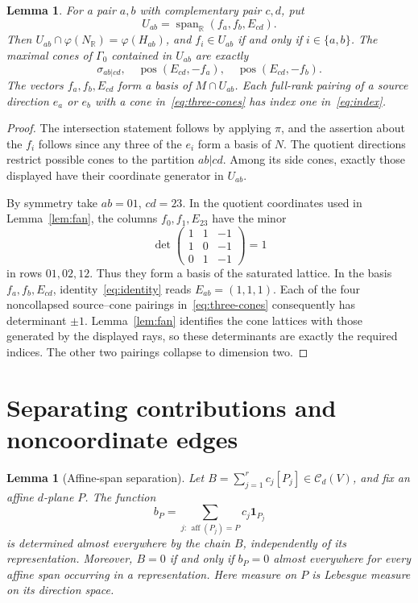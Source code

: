 \documentclass[11pt]{article}
\newtheorem{lemma}[theorem]{Lemma}
\theoremstyle{definition}
\theoremstyle{remark}
\newcommand{\R}{\mathbb R}
\newcommand{\Ch}{\mathcal C}
\newcommand{\NR}{N_{\R}}
\newcommand{\pos}{\operatorname{pos}}
\newcommand{\Span}{\operatorname{span}_{\R}}
\newcommand{\aff}{\operatorname{aff}}
\newcommand{\ind}{\mathbf 1}
\begin{document}
\begin{lemma}\label{lem:coordinate-linear}
For a pair $a,b$ with complementary pair $c,d$, put
\[
 U_{ab}=\Span(f_a,f_b,E_{cd}).
\]
Then $U_{ab}\cap\varphi(\NR)=\varphi(H_{ab})$, and
$f_i\in U_{ab}$ if and only if $i\in\{a,b\}$. The maximal cones
of $\Gamma_0$ contained in $U_{ab}$ are exactly
\begin{equation}\label{eq:three-cones}
 \sigma_{ab|cd},\quad
 \pos(E_{cd},-f_a),\quad\pos(E_{cd},-f_b).
\end{equation}
The vectors $f_a,f_b,E_{cd}$ form a basis of $M\cap U_{ab}$.
Each full-rank pairing of a source direction $e_a$ or $e_b$ with a
cone in~\eqref{eq:three-cones} has index one
in~\eqref{eq:index}.
\end{lemma}

\begin{proof}
The intersection statement follows by applying $\pi$, and the assertion
about the $f_i$ follows since any three of the $e_i$ form a basis of
$N$. The quotient directions restrict possible cones to the partition
$ab|cd$. Among its side cones, exactly those displayed have their
coordinate generator in $U_{ab}$.

By symmetry take $ab=01$, $cd=23$. In the quotient coordinates used in
Lemma~\ref{lem:fan}, the columns $f_0,f_1,E_{23}$ have the minor
\[
 \det\begin{pmatrix}
 1&1&-1\\1&0&-1\\0&1&-1
 \end{pmatrix}=1
\]
in rows $01,02,12$. Thus they form a basis of the saturated lattice.
In the basis $f_a,f_b,E_{cd}$, identity~\eqref{eq:identity} reads
$E_{ab}=(1,1,1)$. Each of the four noncollapsed source--cone pairings
in~\eqref{eq:three-cones} consequently has determinant $\pm1$.
Lemma~\ref{lem:fan} identifies the cone lattices with those generated by
the displayed rays, so these determinants are exactly the required
indices. The other two pairings collapse to dimension two.
\end{proof}

\section{Separating contributions and noncoordinate edges}

\begin{lemma}[Affine-span separation]\label{lem:separation}
Let $B=\sum_{j=1}^r c_j[P_j]\in\Ch_d(V)$, and fix an affine
$d$-plane $P$. The function
\[
 b_P=\sum_{j:\,\aff(P_j)=P}c_j\ind_{P_j}
\]
is determined almost everywhere by the chain $B$, independently of
its representation. Moreover, $B=0$ if and only if $b_P=0$ almost
everywhere for every affine span occurring in a representation.
Here measure on $P$ is Lebesgue measure on its direction space.
\end{lemma}
\end{document}
